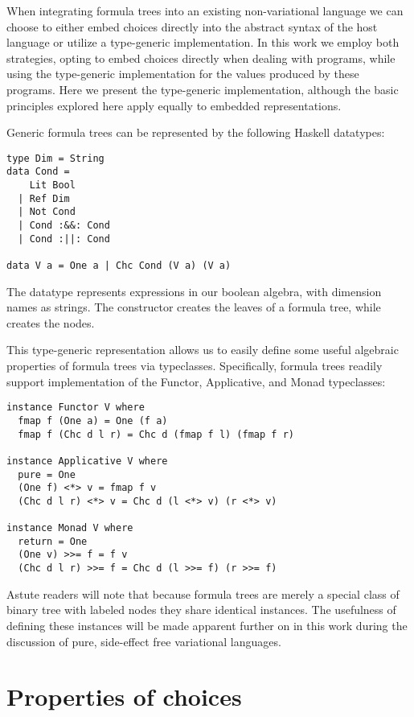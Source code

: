 \documentclass[12pt,oneside]{book}
\begin{document}
When integrating formula trees into an existing non-variational language we can choose to
either embed choices directly into the abstract syntax of the host language or utilize a type-generic
implementation. In this work we employ both strategies, opting to embed choices directly when dealing
with programs, while using the type-generic implementation for the values produced by these programs.
Here we present the type-generic implementation, although the basic principles explored here apply
equally to embedded representations.

Generic formula trees can be represented by the following Haskell datatypes:

\begin{lstlisting}
type Dim = String
data Cond =
    Lit Bool
  | Ref Dim
  | Not Cond
  | Cond :&&: Cond
  | Cond :||: Cond

data V a = One a | Chc Cond (V a) (V a)
\end{lstlisting}

The datatype  represents expressions in our boolean algebra, with dimension names as strings.
The constructor  creates the leaves of a formula tree, while  creates the nodes.

This type-generic representation allows us to easily define some useful algebraic properties of
formula trees via typeclasses. Specifically, formula trees readily support implementation of the
Functor, Applicative, and Monad typeclasses:

\begin{lstlisting}
instance Functor V where
  fmap f (One a) = One (f a)
  fmap f (Chc d l r) = Chc d (fmap f l) (fmap f r)
  
instance Applicative V where
  pure = One
  (One f) <*> v = fmap f v
  (Chc d l r) <*> v = Chc d (l <*> v) (r <*> v)
  
instance Monad V where
  return = One
  (One v) >>= f = f v
  (Chc d l r) >>= f = Chc d (l >>= f) (r >>= f)
\end{lstlisting}

Astute readers will note that because formula trees are merely a special class of binary tree with
labeled nodes they share identical instances. The usefulness of defining these instances will be made
apparent further on in this work during the discussion of pure, side-effect free variational languages.

\section{Properties of choices}
\label{sec:props}
\end{document}
